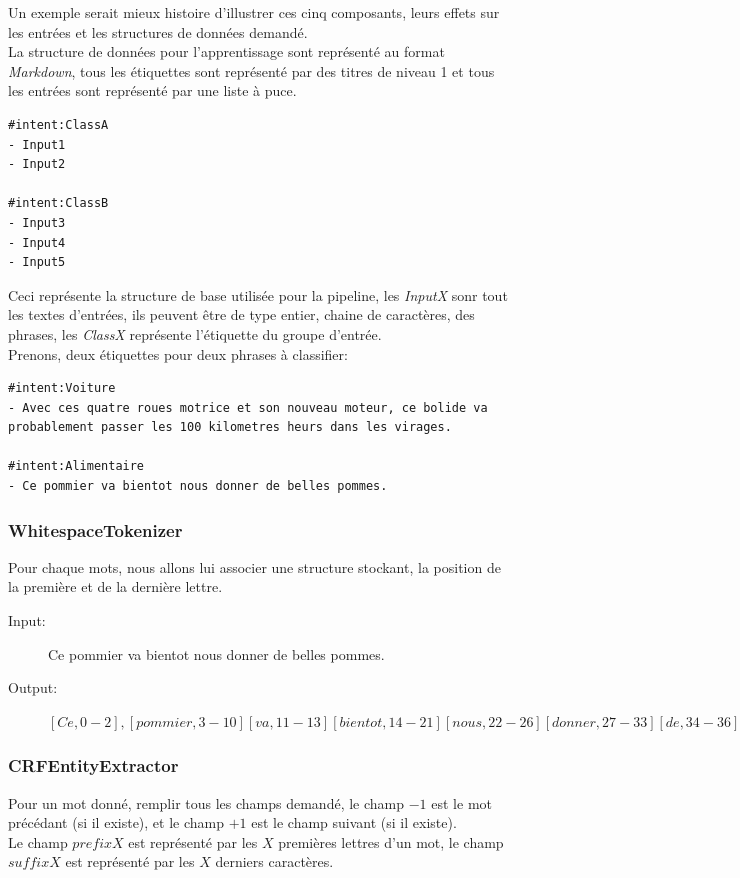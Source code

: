 \pagebreak

Un exemple serait mieux histoire d'illustrer ces cinq composants, leurs effets sur les entrées et les structures de données demandé.\\
La structure de données pour l'apprentissage sont représenté au format \textit{Markdown}, tous les étiquettes sont représenté par des titres de niveau 1 et tous les entrées sont représenté par une liste à puce.\\

\begin{lstlisting}
#intent:ClassA
- Input1
- Input2

#intent:ClassB
- Input3
- Input4
- Input5
\end{lstlisting}

Ceci représente la structure de base utilisée pour la pipeline, les \textit{InputX} sonr tout les textes d'entrées, ils peuvent être de type entier, chaine de caractères, des phrases, les \textit{ClassX} représente l'étiquette du groupe d'entrée.\\
Prenons, deux étiquettes pour deux phrases à classifier:\\

\begin{lstlisting}
#intent:Voiture
- Avec ces quatre roues motrice et son nouveau moteur, ce bolide va probablement passer les 100 kilometres heurs dans les virages.

#intent:Alimentaire
- Ce pommier va bientot nous donner de belles pommes.
\end{lstlisting}

\subsubsection{WhitespaceTokenizer}
Pour chaque mots, nous allons lui associer une structure stockant, la position de la première et de la dernière lettre. 

\begin{description}
\item[Input:] Ce pommier va bientot nous donner de belles pommes.\\
\item[Output:] $[Ce,0-2],[pommier,3-10][va,11-13][bientot,14-21][nous,22-26][donner,27-33][de,34-36][belles,37-43][pommes,44-50]$
\end{description}

\pagebreak
\subsubsection{CRFEntityExtractor}
Pour un mot donné, remplir tous les champs demandé, le champ $-1$ est le mot précédant (si il existe), et le champ $+1$ est le champ suivant (si il existe).\\
Le champ $prefixX$ est représenté par les $X$ premières lettres d'un mot, le champ $suffixX$ est représenté par les $X$ derniers caractères.

